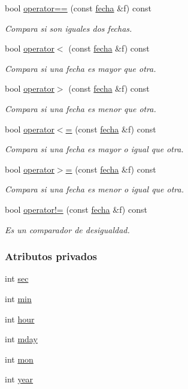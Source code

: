 \begin{DoxyCompactItemize}
bool \hyperlink{classfecha_ac971e131a6e3edf57c2313468524f364}{operator==} (const \hyperlink{classfecha}{fecha} \&f) const 
\begin{DoxyCompactList}\small\item\em Compara si son iguales dos fechas. \end{DoxyCompactList}\item 
bool \hyperlink{classfecha_a27803300b9698e1a40ef48f2009948c5}{operator$<$} (const \hyperlink{classfecha}{fecha} \&f) const 
\begin{DoxyCompactList}\small\item\em Compara si una fecha es mayor que otra. \end{DoxyCompactList}\item 
bool \hyperlink{classfecha_aaded7646e80d88492b31b17b4fb001fd}{operator$>$} (const \hyperlink{classfecha}{fecha} \&f) const 
\begin{DoxyCompactList}\small\item\em Compara si una fecha es menor que otra. \end{DoxyCompactList}\item 
bool \hyperlink{classfecha_a8dfb2f2a7424bdb1dacc6df122b0a0c8}{operator$<$=} (const \hyperlink{classfecha}{fecha} \&f) const 
\begin{DoxyCompactList}\small\item\em Compara si una fecha es mayor o igual que otra. \end{DoxyCompactList}\item 
bool \hyperlink{classfecha_a98d0f3009cb7205b5ddb3b81596d9cc7}{operator$>$=} (const \hyperlink{classfecha}{fecha} \&f) const 
\begin{DoxyCompactList}\small\item\em Compara si una fecha es menor o igual que otra. \end{DoxyCompactList}\item 
bool \hyperlink{classfecha_a1f6d28759c45b138efb80d25a7c398b8}{operator!=} (const \hyperlink{classfecha}{fecha} \&f) const 
\begin{DoxyCompactList}\small\item\em Es un comparador de desigualdad. \end{DoxyCompactList}\end{DoxyCompactItemize}
\subsubsection*{Atributos privados}
\begin{DoxyCompactItemize}
\item 
int \hyperlink{classfecha_a09eb9f4865c9ff896f438b8df3cf6485}{sec}
\item 
int \hyperlink{classfecha_a3875f28ff6e7c383923c80e86afaec2e}{min}
\item 
int \hyperlink{classfecha_a895a2cc9dd11326a8392a4c6fc928a14}{hour}
\item 
int \hyperlink{classfecha_a9c1dc50e5f5efcd3e30a981bfd495b1d}{mday}
\item 
int \hyperlink{classfecha_a5c86be74f1215600f99798d54126ba16}{mon}
\item 
int \hyperlink{classfecha_a4d06534f05a6350ae229ce2b17b860e8}{year}
\end{DoxyCompactItemize}
